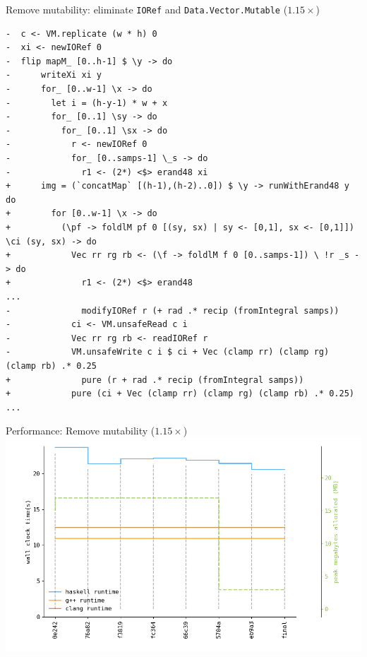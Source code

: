 \documentclass[8pt]{beamer}
\begin{document}
\begin{frame}[fragile]{Remove mutability: eliminate \texttt{IORef} and \texttt{Data.Vector.Mutable} ($1.15\times$)}
\begin{verbatim}
-  c <- VM.replicate (w * h) 0
-  xi <- newIORef 0
-  flip mapM_ [0..h-1] $ \y -> do
-      writeXi xi y
-      for_ [0..w-1] \x -> do
-        let i = (h-y-1) * w + x
-        for_ [0..1] \sy -> do
-          for_ [0..1] \sx -> do
-            r <- newIORef 0
-            for_ [0..samps-1] \_s -> do
-              r1 <- (2*) <$> erand48 xi
+      img = (`concatMap` [(h-1),(h-2)..0]) $ \y -> runWithErand48 y do
+        for [0..w-1] \x -> do
+          (\pf -> foldlM pf 0 [(sy, sx) | sy <- [0,1], sx <- [0,1]]) \ci (sy, sx) -> do
+            Vec rr rg rb <- (\f -> foldlM f 0 [0..samps-1]) \ !r _s -> do
+              r1 <- (2*) <$> erand48
...
-              modifyIORef r (+ rad .* recip (fromIntegral samps))
-            ci <- VM.unsafeRead c i
-            Vec rr rg rb <- readIORef r
-            VM.unsafeWrite c i $ ci + Vec (clamp rr) (clamp rg) (clamp rb) .* 0.25
+              pure (r + rad .* recip (fromIntegral samps))
+            pure (ci + Vec (clamp rr) (clamp rg) (clamp rb) .* 0.25)
...
\end{verbatim}



\end{frame}



\begin{frame}[fragile]{Performance: Remove mutability  ($1.15\times$)}
\includegraphics[height=0.6\textwidth]{perfdata-upto-eb9a3-gen.png}
\end{frame}
\end{document}
